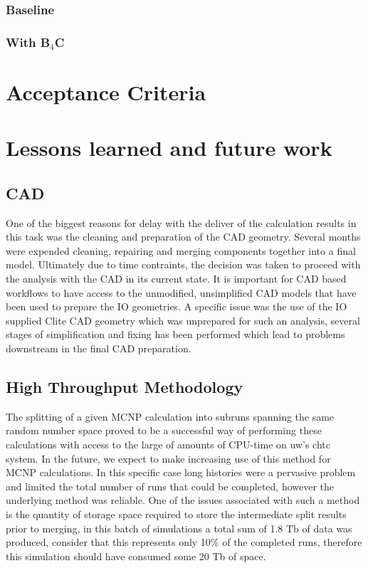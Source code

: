 \documentclass[12pt]{article}
\begin{document}
\subsubsection{Baseline}
\subsubsection{With B$_4$C}
\newpage
\clearpage
\section{Acceptance Criteria}
\newpage
\clearpage
\section{Lessons learned and future work}
\subsection*{CAD}
One of the biggest reasons for delay with the deliver of the calculation results
in this task was the cleaning and preparation of the CAD geometry. Several
months were expended cleaning, repairing and merging components together into a
final model. Ultimately due to time contraints, the decision was taken to
proceed with the analysis with the CAD in its current state. It is important
for CAD based workflows to have access to the unmodified, unsimplified CAD
models that have been used to prepare the IO geometries. A specific issue
was the use of the IO supplied Clite CAD geometry which was unprepared for
such an analysis, several stages of simplification and fixing has been performed
which lead to problems downstream in the final CAD preparation.
\subsection*{High Throughput Methodology}
The splitting of a given MCNP calculation into subruns spanning the same random
number space proved to be a successful way of performing these calculations with
access to the large of amounts of CPU-time on \gls{uw}'s \gls{chtc} system. In
the future, we expect to make increasing use of this method for MCNP
calculations. In this specific case long histories were a pervasive problem and
limited the total number of runs that could be completed, however the underlying
method was reliable. One of the issues associated with such a method is the
quantity of storage space required to store the intermediate split results prior
to merging, in this batch of simulations a total sum of 1.8 Tb of data was
produced, consider that this represents only 10\% of the completed runs,
therefore this simulation should have consumed some 20 Tb of space.
\end{document}
